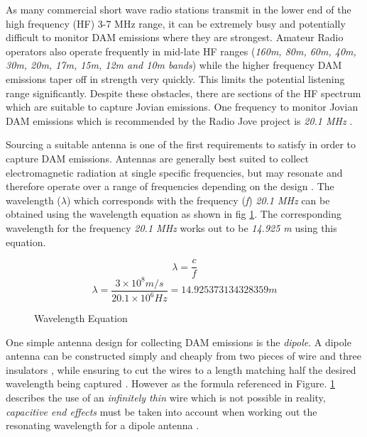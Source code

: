 \documentclass[runningheads,a4paper]{llncs}
\begin{document}
As many commercial short wave radio stations transmit in the lower end of the high frequency (\gls{HF}) 3-7 MHz range, it can be extremely busy and potentially difficult to monitor \gls{DAM} emissions where they are strongest. Amateur Radio operators also operate frequently in mid-late \gls{HF} ranges (\textit{160m, 80m, 60m, 40m, 30m, 20m, 17m, 15m, 12m and 10m bands}) while the higher frequency \gls{DAM} emissions taper off in strength very quickly. This limits the potential listening range significantly. Despite these obstacles, there are sections of the \gls{HF} spectrum which are suitable to capture Jovian emissions. One frequency to monitor Jovian \gls{DAM} emissions which is recommended by the Radio Jove project is \textit{20.1 MHz} \citep{nasa12}. 

Sourcing a suitable antenna is one of the first requirements to satisfy in order to capture \gls{DAM} emissions. Antennas are generally best suited to collect electromagnetic radiation at single specific frequencies, but may resonate and therefore operate over a range of frequencies depending on the design \citep{nasa12}. The wavelength ($\lambda$) which corresponds with the frequency (\textit{f}) \textit{20.1 MHz} can be obtained using the wavelength equation as shown in fig \ref{fig:wavelength_equation}. The corresponding wavelength for the frequency \textit{20.1 MHz} works out to be \textit{14.925 m} using this equation.

%
\begin{figure}[here]
  \centering
  \begin{equation}  	
    \lambda = \frac{c}{f}
  \end{equation}
  \begin{equation}
    \lambda = \frac{3\times10^8 m/s}{20.1\times10^6 Hz} = 14.925373134328359 m
  \end{equation}
  \caption{Wavelength Equation}
  \label{fig:wavelength_equation}
\end{figure}
%

One simple antenna design for collecting \gls{DAM} emissions is the \textit{dipole}. A dipole antenna can be constructed simply and cheaply from two pieces of wire and three insulators \citep{nasa12}, while ensuring to cut the wires to a length matching half the desired wavelength being captured \citep{nasa12}. However as the formula referenced in Figure. \ref{fig:wavelength_equation} describes the use of an \textit{infinitely thin} wire which is not possible in reality, \textit{capacitive end effects} must be taken into account when working out the resonating wavelength for a dipole antenna \citep{nasa12}.
\end{document}
